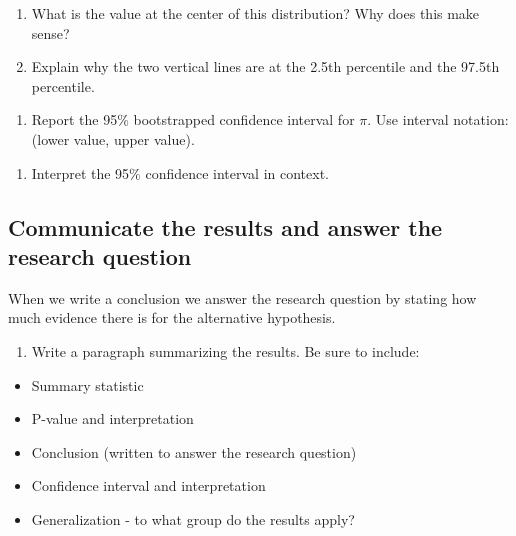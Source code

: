 \documentclass[
]{report}
\providecommand{\tightlist}{%
  \setlength{\itemsep}{0pt}\setlength{\parskip}{0pt}}
\begin{document}
\begin{enumerate}
\def\labelenumi{\arabic{enumi}.}
\setcounter{enumi}{24}
\item
  What is the value at the center of this distribution? Why does this make sense?
  \vspace{1in}
\item
  Explain why the two vertical lines are at the 2.5th percentile and the 97.5th percentile.
\end{enumerate}

\vspace{1in}

\begin{enumerate}
\def\labelenumi{\arabic{enumi}.}
\setcounter{enumi}{26}
\tightlist
\item
  Report the 95\% bootstrapped confidence interval for \(\pi\). Use interval notation: (lower value, upper value).
\end{enumerate}

\vspace{1in}

\begin{enumerate}
\def\labelenumi{\arabic{enumi}.}
\setcounter{enumi}{27}
\tightlist
\item
  Interpret the 95\% confidence interval in context.
\end{enumerate}

\vspace{1in}

\hypertarget{communicate-the-results-and-answer-the-research-question}{%
\subsection{Communicate the results and answer the research question}\label{communicate-the-results-and-answer-the-research-question}}

When we write a conclusion we answer the research question by stating how much evidence there is for the alternative hypothesis.

\begin{enumerate}
\def\labelenumi{\arabic{enumi}.}
\setcounter{enumi}{28}
\tightlist
\item
  Write a paragraph summarizing the results. Be sure to include:
\end{enumerate}

\begin{itemize}
\item
  Summary statistic
\item
  P-value and interpretation
\item
  Conclusion (written to answer the research question)
\item
  Confidence interval and interpretation
\item
  Generalization - to what group do the results apply?
\end{itemize}
\end{document}
